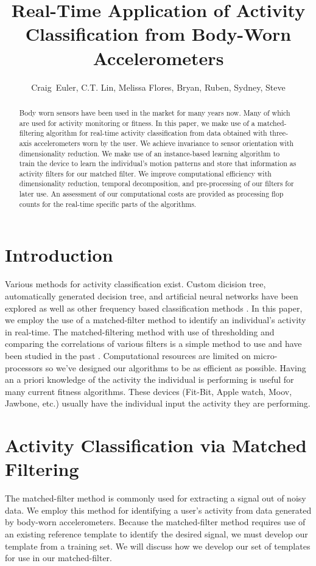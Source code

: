 \documentclass[journal]{IEEEtran}
\begin{document}
%
\title{Real-Time Application of Activity Classification from Body-Worn Accelerometers}
%
\author{Craig~Euler, C.T. Lin, Melissa Flores, Bryan, Ruben, Sydney, Steve}
%
\maketitle
%
\begin{abstract}
Body worn sensors have been used in the market for many years now.
Many of which are used for activity monitoring or fitness.
In this paper, we make use of a matched-filtering algorithm for real-time activity classification from data obtained with three-axis accelerometers worn by the user.
We achieve invariance to sensor orientation with dimensionality reduction.
We make use of an instance-based learning algorithm to train the device to learn the individual's motion patterns and store that information as activity filters for our matched filter.
We improve computational efficiency with dimensionality reduction, temporal decomposition, and pre-processing of our filters for later use.
An assessment of our computational costs are provided as processing flop counts for the real-time specific parts of the algorithms.
\end{abstract}
%
\section{Introduction}
Various methods for activity classification exist.
Custom dicision tree, automatically generated decision tree, and artificial neural networks \cite{parkka_ermes_korpipaa_mantyjarvi_peltola_korhonen_2006} have been explored as well as other frequency based classification methods \cite{sharma_purwar_lee_lee_chung_2008}.
In this paper, we employ the use of a matched-filter method to identify an individual’s activity in real-time.
The matched-filtering method with use of thresholding and comparing the correlations of various filters is a simple method to use and have been studied in the past \cite{giannakis_tsatsanis_1990}.
Computational resources are limited on micro-processors so we've designed our algorithms to be as efficient as possible.
Having an a priori knowledge of the activity the individual is performing is useful for many current fitness algorithms.
These devices (Fit-Bit, Apple watch, Moov, Jawbone, etc.) usually have the individual input the activity they are performing.
%
\section{Activity Classification via Matched Filtering}
The matched-filter method is commonly used for extracting a signal out of noisy data.
We employ this method for identifying a user’s activity from data generated by body-worn accelerometers.
Because the matched-filter method requires use of an existing reference template to identify the desired signal, we must develop our template from a training set.
We will discuss how we develop our set of templates for use in our matched-filter.
\end{document}
